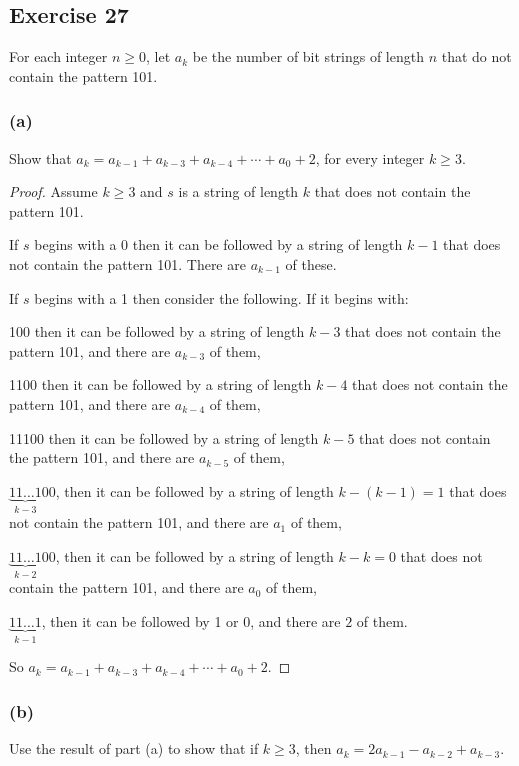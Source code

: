 \documentclass[14pt]{extarticle}
\begin{document}
\subsection{Exercise 27}
For each integer \(n \geq 0\), let \(a_k\) be the number of bit strings of length $n$ that do not contain the pattern
101.

\subsubsection{(a)}
Show that \(a_k = a_{k-1} + a_{k-3} + a_{k-4} + \cdots + a_0 + 2\), for every integer \(k \geq 3\).

\begin{proof}
     Assume \(k \geq 3\) and $s$ is a string of length $k$ that does not contain the pattern 101.

     If $s$ begins with a 0 then it can be followed by a string of length $k-1$ that does not contain the pattern 101.
     There are \(a_{k-1}\) of these.

     If $s$ begins with a 1 then consider the following. If it begins with:

     100 then it can be followed by a string of length $k-3$ that does not contain the pattern 101, and there are
     \(a_{k-3}\) of them,

     1100 then it can be followed by a string of length $k-4$ that does not contain the pattern 101, and there are
     \(a_{k-4}\) of them,

     11100 then it can be followed by a string of length $k-5$ that does not contain the pattern 101, and there are
     \(a_{k-5}\) of them,

     \(\underbrace{11\ldots 1}_{k-3}00\), then it can be followed by a string of length $k-(k-1) = 1$ that does not
     contain the pattern 101, and there are \(a_1\) of them,

     \(\underbrace{11\ldots 1}_{k-2}00\), then it can be followed by a string of length $k-k = 0$ that does not
     contain the pattern 101, and there are \(a_0\) of them,

     \(\underbrace{11\ldots 1}_{k-1}\), then it can be followed by 1 or 0, and there are \(2\) of them.

     So \(a_k= a_{k-1} + a_{k-3} + a_{k-4} + \cdots + a_0 + 2\).
\end{proof}

\subsubsection{(b)}
Use the result of part (a) to show that if \(k \geq 3\), then \(a_k = 2a_{k-1} - a_{k-2} + a_{k-3}\).
\end{document}
